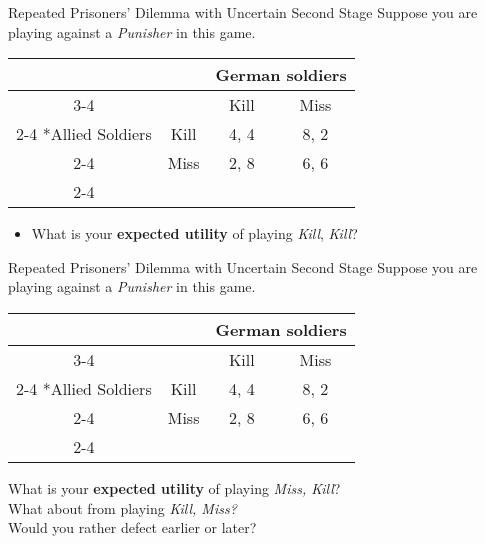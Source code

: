 \begin{frame}{Repeated Prisoners' Dilemma with Uncertain Second Stage}
  Suppose you are playing against a \textit{Punisher} in this game. 

  \begin{center}
    \begin{tabular}{*{4}{c|}}
      \multicolumn{2}{c}{} & \multicolumn{2}{c}{German soldiers} \\ \cline{3-4}
      \multicolumn{1}{c}{} &    & Kill & Miss \\ \cline{2-4}
      \multirow{2}*{Allied Soldiers} & Kill & 4, 4 & 8, 2 \\ \cline{2-4}
                         & Miss & 2, 8 & 6, 6 \\ \cline{2-4} 
    \end{tabular} 
  \end{center}

  \begin{itemize}
    \item What is your \textbf{expected utility} of playing \textit{Kill}, \textit{Kill}?
  \end{itemize}
  \vspace{10mm}
\end{frame}

\begin{frame}{Repeated Prisoners' Dilemma with Uncertain Second Stage}
  Suppose you are playing against a \textit{Punisher} in this game. 

  \begin{center}
    \begin{tabular}{*{4}{c|}}
      \multicolumn{2}{c}{} & \multicolumn{2}{c}{German soldiers} \\ \cline{3-4}
      \multicolumn{1}{c}{} &    & Kill & Miss \\ \cline{2-4}
      \multirow{2}*{Allied Soldiers} & Kill & 4, 4 & 8, 2 \\ \cline{2-4}
                         & Miss & 2, 8 & 6, 6 \\ \cline{2-4} 
    \end{tabular} 
  \end{center}

  What is your \textbf{expected utility} of playing \textit{Miss, Kill}? \\
  \vspace{10mm}
  What about from playing \textit{Kill, Miss?} \\
  \vspace{10mm}
  Would you rather defect earlier or later?
\end{frame}

